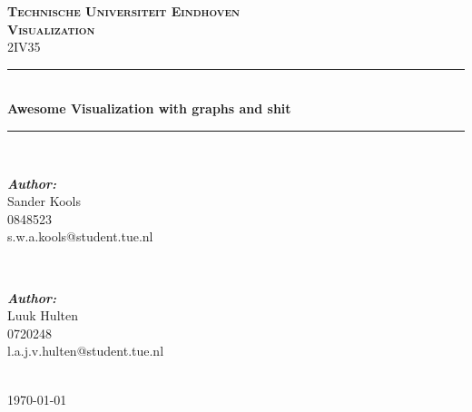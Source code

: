 \documentclass[a4paper,twoside,11pt]{article}
\newcommand{\HRule}{\rule{\linewidth}{0.5mm}} %
\begin{document}
\begin{titlepage}

\center %

\textsc{\Huge \textbf{Technische Universiteit Eindhoven}}\\[1.5cm] %
\textsc{\LARGE \textbf{Visualization}}\\[0.5cm] %
\textsc{\large 2IV35}\\[0.5cm] %

\HRule \\[0.4cm]
{ \huge \bfseries Awesome Visualization with graphs and shit}\\[0.4cm] %
\HRule \\[1.5cm]

\begin{minipage}{0.4\textwidth}
\begin{flushleft} \large
\emph{\textbf{Author:}}\\
Sander Kools \\
0848523 \\
s.w.a.kools@student.tue.nl %
\end{flushleft}
\end{minipage}
~
\begin{minipage}{0.4\textwidth}
\begin{flushright} \large
\emph{\textbf{Author:}}\\
Luuk Hulten\\
0720248 \\
l.a.j.v.hulten@student.tue.nl
\end{flushright}
\end{minipage}\\[4cm]

{\large \today}\\[3cm] %

\vfill %

\end{titlepage}
\end{document}
